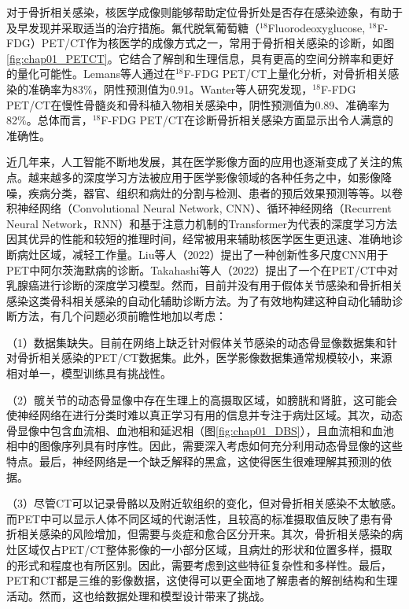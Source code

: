 对于骨折相关感染，核医学成像则能够帮助定位骨折处是否存在感染迹象，有助于及早发现并采取适当的治疗措施。氟代脱氧葡萄糖（\(^{18}\)Fluorodeoxyglucose, \(^{18}\)F-FDG）PET/CT作为核医学的成像方式之一，常用于骨折相关感染的诊断\cite{zhang2021comparative}，如图\ref{fig:chap01_PETCT}。它结合了解剖和生理信息，具有更高的空间分辨率和更好的量化可能性\cite{gholamrezanezhad2018clinical}。Lemans等人\cite{lemans2019diagnostic}通过在\(^{18}\)F-FDG PET/CT上量化分析，对骨折相关感染的准确率为83\%，阴性预测值为0.91。Wanter等人\cite{wenter2016diagnostic}研究发现，\(^{18}\)F-FDG PET/CT在慢性骨髓炎和骨科植入物相关感染中，阴性预测值为0.89、准确率为82\%。总体而言，\(^{18}\)F-FDG PET/CT在诊断骨折相关感染方面显示出令人满意的准确性。

近几年来，人工智能不断地发展，其在医学影像方面的应用也逐渐变成了关注的焦点。越来越多的深度学习方法被应用于医学影像领域的各种任务之中，如影像降噪，疾病分类，器官、组织和病灶的分割与检测、患者的预后效果预测等等\cite{ZSZD202307032,YJTY202304021}。以卷积神经网络（Convolutional Neural Network, CNN）、循环神经网络（Recurrent Neural Network，RNN）和基于注意力机制的Transformer为代表的深度学习方法因其优异的性能和较短的推理时间，经常被用来辅助核医学医生更迅速、准确地诊断病灶区域，减轻工作量。Liu等人\cite{liu2022diagnosis}（2022）提出了一种创新性多尺度CNN用于PET中阿尔茨海默病的诊断。Takahashi等人\cite{takahashi2022deep}（2022）提出了一个在PET/CT中对乳腺癌进行诊断的深度学习模型。然而，目前并没有用于假体关节感染和骨折相关感染这类骨科相关感染的自动化辅助诊断方法。为了有效地构建这种自动化辅助诊断方法，有几个问题必须前瞻性地加以考虑：

（1）数据集缺失。目前在网络上缺乏针对假体关节感染的动态骨显像数据集和针对骨折相关感染的PET/CT数据集。此外，医学影像数据集通常规模较小，来源相对单一，模型训练具有挑战性。

（2）髋关节的动态骨显像中存在生理上的高摄取区域，如膀胱和肾脏，这可能会使神经网络在进行分类时难以真正学习有用的信息并专注于病灶区域。其次，动态骨显像中包含血流相、血池相和延迟相（图\ref{fig:chap01_DBS}），且血流相和血池相中的图像序列具有时序性。因此，需要深入考虑如何充分利用动态骨显像的这些特点。最后，神经网络是一个缺乏解释的黑盒，这使得医生很难理解其预测的依据。

（3）尽管CT可以记录骨骼以及附近软组织的变化，但对骨折相关感染不太敏感。而PET中可以显示人体不同区域的代谢活性，且较高的标准摄取值反映了患有骨折相关感染的风险增加，但需要与炎症和愈合区分开来。其次，骨折相关感染的病灶区域仅占PET/CT整体影像的一小部分区域，且病灶的形状和位置多样，摄取的形式和程度也有所区别。因此，需要考虑到这些特征复杂性和多样性。最后，PET和CT都是三维的影像数据，这使得可以更全面地了解患者的解剖结构和生理活动。然而，这也给数据处理和模型设计带来了挑战。

